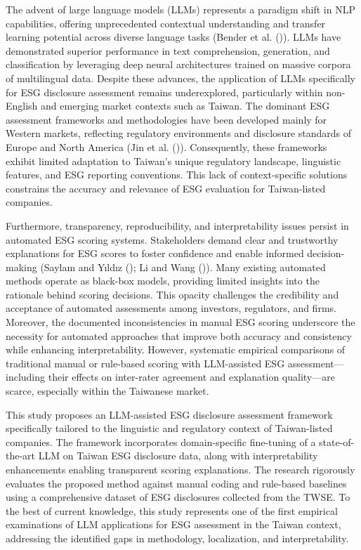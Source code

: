 \documentclass[
  12pt,
]{article}
\begin{document}
The advent of large language models (LLMs) represents a paradigm shift
in NLP capabilities, offering unprecedented contextual understanding and
transfer learning potential across diverse language tasks (Bender et al.
()). LLMs have demonstrated superior
performance in text comprehension, generation, and classification by
leveraging deep neural architectures trained on massive corpora of
multilingual data. Despite these advances, the application of LLMs
specifically for ESG disclosure assessment remains underexplored,
particularly within non-English and emerging market contexts such as
Taiwan. The dominant ESG assessment frameworks and methodologies have
been developed mainly for Western markets, reflecting regulatory
environments and disclosure standards of Europe and North America (Jin
et al. ()). Consequently, these frameworks
exhibit limited adaptation to Taiwan's unique regulatory landscape,
linguistic features, and ESG reporting conventions. This lack of
context-specific solutions constrains the accuracy and relevance of ESG
evaluation for Taiwan-listed companies.

Furthermore, transparency, reproducibility, and interpretability issues
persist in automated ESG scoring systems. Stakeholders demand clear and
trustworthy explanations for ESG scores to foster confidence and enable
informed decision-making (Saylam and Yıldız
(); Li and Wang
()). Many existing automated methods operate
as black-box models, providing limited insights into the rationale
behind scoring decisions. This opacity challenges the credibility and
acceptance of automated assessments among investors, regulators, and
firms. Moreover, the documented inconsistencies in manual ESG scoring
underscore the necessity for automated approaches that improve both
accuracy and consistency while enhancing interpretability. However,
systematic empirical comparisons of traditional manual or rule-based
scoring with LLM-assisted ESG assessment---including their effects on
inter-rater agreement and explanation quality---are scarce, especially
within the Taiwanese market.

This study proposes an LLM-assisted ESG disclosure assessment framework
specifically tailored to the linguistic and regulatory context of
Taiwan-listed companies. The framework incorporates domain-specific
fine-tuning of a state-of-the-art LLM on Taiwan ESG disclosure data,
along with interpretability enhancements enabling transparent scoring
explanations. The research rigorously evaluates the proposed method
against manual coding and rule-based baselines using a comprehensive
dataset of ESG disclosures collected from the TWSE. To the best of
current knowledge, this study represents one of the first empirical
examinations of LLM applications for ESG assessment in the Taiwan
context, addressing the identified gaps in methodology, localization,
and interpretability.
\end{document}
